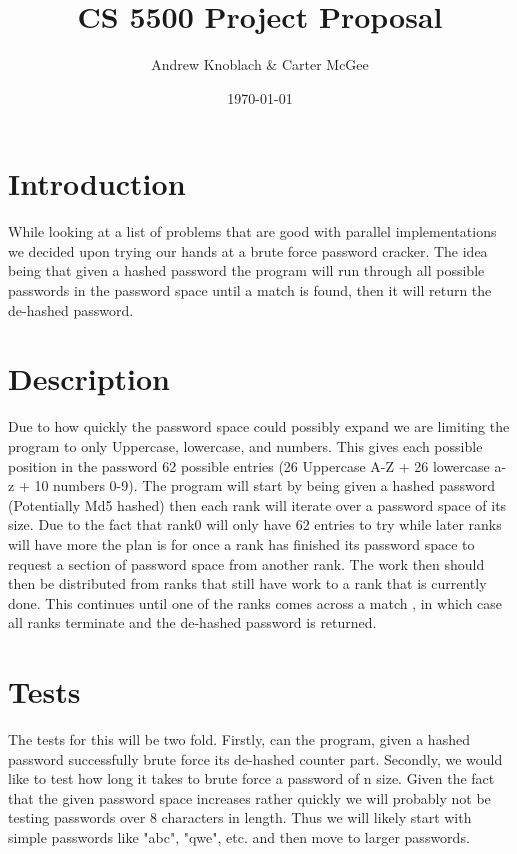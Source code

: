 \documentclass[11pt]{article}
\title{CS 5500 Project Proposal}
\author{Andrew Knoblach \& Carter McGee}
\date{\today}
\begin{document}
\maketitle

\section{Introduction}

While looking at a list of problems that are good with parallel implementations we decided upon trying our hands at a brute force password cracker. The idea being that given a hashed password the program will run through all possible passwords in the password space until a match is found, then it will return the de-hashed password.

\section{Description}

Due to how quickly the password space could possibly expand we are limiting the program to only Uppercase, lowercase, and numbers. This gives each possible position in the password 62 possible entries (26 Uppercase A-Z + 26 lowercase a-z + 10 numbers 0-9). The program will start by being given a hashed password (Potentially Md5 hashed) then each rank will iterate over a password space of its size. Due to the fact that rank0 will only have 62 entries to try while later ranks will have more the plan is for once a rank has finished its password space to request a section of password space from another rank. The work then should then be distributed from ranks that still have work to a rank that is currently done. This continues until one of the ranks comes across a match , in which case all ranks terminate and the de-hashed password is returned.

\section{Tests}

The tests for this will be two fold. Firstly, can the program, given a hashed password successfully brute force its de-hashed counter part. Secondly, we would like to test how long it takes to brute force a password of n size. Given the fact that the given password space increases rather quickly we will probably not be testing passwords over 8 characters in length. Thus we will likely start with simple passwords like "abc", "qwe", etc. and then move to larger passwords.
\end{document}
